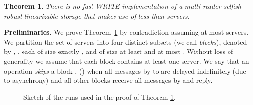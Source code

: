 \documentclass[10pt,conference,compsocconf]{IEEEtran}
\newtheorem{theo}[defn]{Theorem}
\begin{document}
\begin{theo} \label{theo:lb}
There is no \emph{fast} \textsc{WRITE} implementation  of a multi-reader \emph{selfish} robust linearizable storage that makes use of less than  servers.
\end{theo}
\noindent \textbf{Preliminaries}.
We prove Theorem~\ref{theo:lb} by contradiction assuming at most  servers. We partition the set of servers into four distinct subsets (we call \emph{blocks}), denoted by , ,  each of size exactly , and  of size at least  and at most . Without loss of generality we assume that each block contains at least one server. We say that an operation  \emph{skips} a block , () when all messages by  to  are delayed indefinitely (due to asynchrony) and all other blocks  receive all messages by  and reply.

\begin{figure}[tbp]
 \begin{center}



\end{center}
 \vspace{-0.5cm}
 \caption{Sketch of the runs used in the proof of Theorem \ref{theo:lb}.}
\label{fig:proof_lb}
\end{figure}
\end{document}
